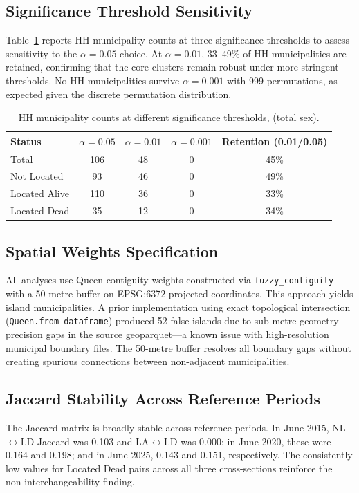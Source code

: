 \subsection{Significance Threshold Sensitivity}

Table~\ref{tab:threshold} reports HH municipality counts at three significance thresholds to assess sensitivity to the $\alpha = 0.05$ choice.
At $\alpha = 0.01$, 33--49\% of HH municipalities are retained, confirming that the core clusters remain robust under more stringent thresholds.
No HH municipalities survive $\alpha = 0.001$ with 999 permutations, as expected given the discrete permutation distribution.

\begin{table}[htbp]
  \centering
  \caption{HH municipality counts at different significance thresholds,  (total sex).}
  \label{tab:threshold}
  \begin{tabular}{lcccc}
    \toprule
    Status & $\alpha=0.05$ & $\alpha=0.01$ & $\alpha=0.001$ & Retention (0.01/0.05) \\
    \midrule
    Total & 106 & 48 & 0 & 45\% \\
    Not Located & 93 & 46 & 0 & 49\% \\
    Located Alive & 110 & 36 & 0 & 33\% \\
    Located Dead & 35 & 12 & 0 & 34\% \\
    \bottomrule
  \end{tabular}
\end{table}

\subsection{Spatial Weights Specification}

All analyses use Queen contiguity weights constructed via \texttt{fuzzy\_contiguity} with a 50-metre buffer on EPSG:6372 projected coordinates.
This approach yields \nislands{} island municipalities.
A prior implementation using exact topological intersection (\texttt{Queen.from\_dataframe}) produced 52 false islands due to sub-metre geometry precision gaps in the source geoparquet---a known issue with high-resolution municipal boundary files.
The 50-metre buffer resolves all boundary gaps without creating spurious connections between non-adjacent municipalities.

\subsection{Jaccard Stability Across Reference Periods}

The Jaccard matrix is broadly stable across reference periods.
In June 2015, NL$\leftrightarrow$LD Jaccard was 0.103 and LA$\leftrightarrow$LD was 0.000; in June 2020, these were 0.164 and 0.198; and in June 2025, 0.143 and 0.151, respectively.
The consistently low values for Located Dead pairs across all three cross-sections reinforce the non-interchangeability finding.
